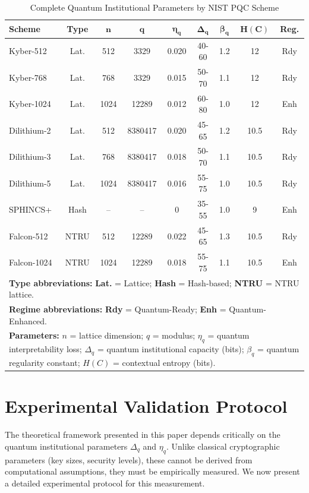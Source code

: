 \documentclass{ieeeaccess}
\begin{document}
\begin{table}[h]
\centering
\caption{Complete Quantum Institutional Parameters by NIST PQC Scheme}
\label{tab:params_complete}
\footnotesize
\setlength{\tabcolsep}{1.5pt}
\begin{tabular}{lcccccccc}
\toprule
\textbf{Scheme} & \textbf{Type} & $\boldsymbol{n}$ & $\boldsymbol{q}$ & $\boldsymbol{\eta_q}$ & $\boldsymbol{\Delta_q}$ & $\boldsymbol{\beta_q}$ & $\boldsymbol{H(C)}$ & \textbf{Reg.} \\
\midrule
Kyber-512 & Lat. & 512 & 3329 & 0.020 & 40-60 & 1.2 & 12 & Rdy \\
Kyber-768 & Lat. & 768 & 3329 & 0.015 & 50-70 & 1.1 & 12 & Rdy \\
Kyber-1024 & Lat. & 1024 & 12289 & 0.012 & 60-80 & 1.0 & 12 & Enh \\
Dilithium-2 & Lat. & 512 & 8380417 & 0.020 & 45-65 & 1.2 & 10.5 & Rdy \\
Dilithium-3 & Lat. & 768 & 8380417 & 0.018 & 50-70 & 1.1 & 10.5 & Rdy \\
Dilithium-5 & Lat. & 1024 & 8380417 & 0.016 & 55-75 & 1.0 & 10.5 & Rdy \\
SPHINCS+ & Hash & -- & -- & 0 & 35-55 & 1.0 & 9 & Enh \\
Falcon-512 & NTRU & 512 & 12289 & 0.022 & 45-65 & 1.3 & 10.5 & Rdy \\
Falcon-1024 & NTRU & 1024 & 12289 & 0.018 & 55-75 & 1.1 & 10.5 & Enh \\
\bottomrule
\multicolumn{9}{p{8.5cm}}{\footnotesize \textbf{Type abbreviations:} 
\textbf{Lat.} = Lattice; \textbf{Hash} = Hash-based; \textbf{NTRU} = NTRU lattice.} \\
\multicolumn{9}{p{8.5cm}}{\footnotesize \textbf{Regime abbreviations:} 
\textbf{Rdy} = Quantum-Ready; \textbf{Enh} = Quantum-Enhanced.} \\
\multicolumn{9}{p{8.5cm}}{\footnotesize \textbf{Parameters:} 
$n$ = lattice dimension; $q$ = modulus; $\eta_q$ = quantum interpretability loss; 
$\Delta_q$ = quantum institutional capacity (bits); $\beta_q$ = quantum regularity constant; 
$H(C)$ = contextual entropy (bits).}
\end{tabular}
\end{table}

\section{Experimental Validation Protocol}\label{app:validation}

The theoretical framework presented in this paper depends critically on the quantum institutional parameters $\Delta_q$ and $\eta_q$. Unlike classical cryptographic parameters (key sizes, security levels), these cannot be derived from computational assumptions, they must be empirically measured. We now present a detailed experimental protocol for this measurement.
\end{document}
